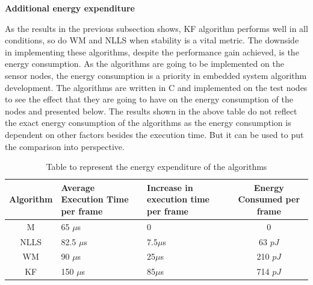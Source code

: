 \documentclass[a4paper,10pt]{report}
\begin{document}
\textbf{Additional energy expenditure}\par \noindent
As the results in the previous subsection shows, KF algorithm performs well in all conditions, so do WM and NLLS when stability is a vital metric. The downside in implementing these algorithms, despite the performance gain achieved, is the energy consumption. As the algorithms are going to be implemented on the sensor nodes, the energy consumption is a priority in embedded system algorithm development. The algorithms are written in C and implemented on the test nodes to see the effect that they are going to have on the energy consumption of the nodes and presented below.\newline
The results shown in the above table do not reflect the exact energy consumption of the algorithms as the energy consumption is dependent on other factors besides the execution time. But it can be used to put the comparison into perspective. 
\begin{table}[!h]
    \caption{Table to represent the energy expenditure of the algorithms} 
    \begin{tabular}{ |c | p{3cm} | p{3cm} |c | }
    \hline
    Algorithm & Average Execution Time per frame & Increase in execution time per frame & Energy Consumed per frame \\ \hline \hline
    M &  65 $\mu$s & 0 & 0  \\ \hline
    NLLS & 82.5 $\mu$s & 7.5$\mu$s & 63 $pJ$  \\ \hline
    WM &   90 $\mu$s & 25$\mu$s & 210 $pJ$ \\ \hline
    KF &  150 $\mu$s  & 85$\mu$s &  714 $pJ$\\ \hline
    \end{tabular}
\label{tab1}
\end{table}
\end{document}
